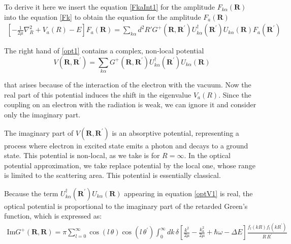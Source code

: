 To derive it here we insert the equation \eqref{FkaInt1} for the amplitude $ F_{k\alpha}(\mathbf{R}) $ into the equation \eqref{Fk} to obtain the equation for the amplitude $ F_a(\mathbf{R}) $
\begin{equation}\label{opt1}
\begin{split}
\left[-\frac{1}{2\mu}\nabla_R^2 + V_a(R) - E \right]F_a(\mathbf{R}) = \sum_{k\alpha}{d^2R'G^{+}(\mathbf{R},\mathbf{R}^{'})U_{k\alpha}^{\dagger}(\mathbf{R}^{'})U_{k\alpha}(\mathbf{R})F_a(\mathbf{R}^{'})}
\end{split}
\end{equation}

The right hand of \eqref{opt1} contains a complex, non-local potential
\begin{equation}\label{optV1}
V(\mathbf{R},\mathbf{R}^{'}) = \sum_{k\alpha}{G^{+}(\mathbf{R},\mathbf{R}^{'})U_{k\alpha}^{\dagger}(\mathbf{R}^{'})U_{k\alpha}(\mathbf{R}) }
\end{equation}

that arises because of the interaction of the electron with the vacuum. Now the real part of this potential induces the shift in the eigenvalue $ V_a(R) $. Since the coupling on an electron with the radiation is weak, we can ignore it and consider only the imaginary part. 

The imaginary part of $ V(\mathbf{R},\mathbf{R}^{'}) $ is an absorptive potential, representing a process where electron in excited state emits a photon and decays to a ground state. This potential is non-local, as we take is for $ R = \infty $. In the optical potential approximation, we take replace potential by the local one, whose range is limited to the scattering area. This potential is essentially classical.

Because the term $ U_{k\alpha}^{\dagger}(\mathbf{R}^{'})U_{k\alpha}(\mathbf{R}) $ appearing in equation \eqref{optV1} is real, the optical potential is proportional to the imaginary part of the retarded Green's function, which is expressed as:
\begin{equation}\label{OptGreen1}
\begin{split}
\text{Im} G^{+}(\mathbf{R},\mathbf{R}) = \pi\sum_{l=0}^{\infty}{\cos(l\, \theta)\cos(l\,\theta^{'})\int_0^{\infty}{dk\,\delta\left[\frac{k^2}{2\mu} - \frac{k^2_a}{2\mu} + \hbar\omega - \Delta E \right]\frac{f_l(kR)f_l(kR^{'})}{R\,R^{'}} }  }
\end{split}
\end{equation}

